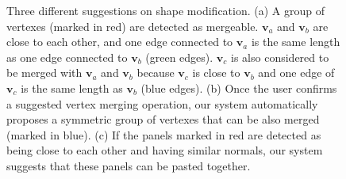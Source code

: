 \begin{figure}
	\centering
	\hfill
	\hfill
	
	\caption{Three different suggestions on shape modification. (a) A group of vertexes (marked in red) are detected as mergeable. $\mathbf{v}_a$ and $\mathbf{v}_b$ are close to each other, and one edge connected to $\mathbf{v}_a$ is the same length as one edge connected to $\mathbf{v}_b$ (green edges). $\mathbf{v}_c$ is also considered to be merged with $\mathbf{v}_a$ and $\mathbf{v}_b$ because $\mathbf{v}_c$ is close to $\mathbf{v}_b$ and one edge of $\mathbf{v}_c$ is the same length as $\mathbf{v}_b$ (blue edges). (b) Once the user confirms a suggested vertex merging operation, our system automatically proposes a symmetric group of vertexes that can be also merged (marked in blue). (c) If the panels marked in red are detected as being close to each other and having similar normals, our system suggests that these panels can be pasted together.}
	\label{fig:suggestion}
\end{figure}

 
